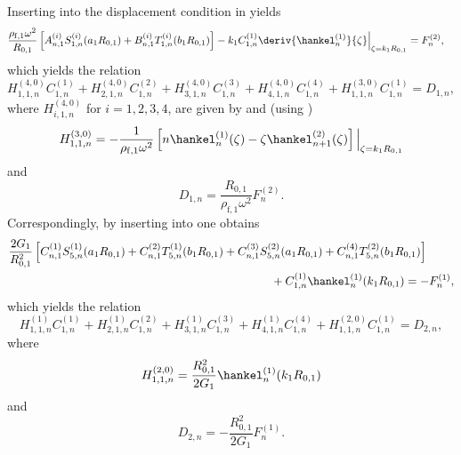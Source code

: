Inserting  into the displacement condition in  yields
\begin{align*}
	&\frac{\rho_{\mathrm{f},1}\omega^2}{R_{0,1}}\left[A_{n,1}^{(i)} S_{1,n}^{(i)}(a_1 R_{0,1}) + B_{n,1}^{(i)} T_{1,n}^{(i)}(b_1 R_{0,1})\right]  -k_1 C_{1,n}^{(1)} \deriv{\hankel^{(1)}_n}{\zeta}\Big\vert_{\zeta=k_1R_{0,1}} = F_n^{(2)},
\end{align*}
which yields the relation
\begin{equation}
	H_{1,1,n}^{(4,0)}C_{1,n}^{(1)} + H_{2,1,n}^{(4,0)}C_{1,n}^{(2)} + H_{3,1,n}^{(4,0)}C_{1,n}^{(3)} + H_{4,1,n}^{(4,0)}C_{1,n}^{(4)} + H_{1,1,n}^{(3,0)}C_{1,n}^{(1)} = D_{1,n},
\end{equation}
where $H_{i,1,n}^{(4,0)}$ for $i=1,2,3,4$, are given by  and (using )
\begin{equation}\label{Eq1:K3011}
	H_{1,1,n}^{(3,0)} = -\frac{1}{\rho_{\mathrm{f},1}\omega^2}\left[n\hankel^{(1)}_n(\zeta) - \zeta \hankel^{(2)}_{n+1}(\zeta)\right]\Big\vert_{\zeta=k_1R_{0,1}}
\end{equation}
and
\begin{equation}\label{Eq1:D1}
	D_{1,n} = \frac{R_{0,1}}{\rho_{\mathrm{f},1}\omega^2}F_n^{(2)}.
\end{equation}
Correspondingly, by inserting  into  one obtains
\begin{align*}
	&\frac{2G_1}{R_{0,1}^2}\left[C_{n,1}^{(1)} S_{5,n}^{(1)}(a_1 R_{0,1}) + C_{n,1}^{(2)} T_{5,n}^{(1)}(b_1 R_{0,1}) + C_{n,1}^{(3)} S_{5,n}^{(2)}(a_1 R_{0,1}) + C_{n,1}^{(4)} T_{5,n}^{(2)}(b_1 R_{0,1})\right] \\
	&{\hskip22.5em\relax} + C_{1,n}^{(1)} \hankel^{(1)}_n(k_1R_{0,1})= -F_n^{(1)},
\end{align*}
which yields the relation
\begin{equation}
	H_{1,1,n}^{(1)}C_{1,n}^{(1)} + H_{2,1,n}^{(1)}C_{1,n}^{(2)} + H_{3,1,n}^{(1)}C_{1,n}^{(3)} + H_{4,1,n}^{(1)}C_{1,n}^{(4)} + H_{1,1,n}^{(2,0)}C_{1,n}^{(1)} = D_{2,n},
\end{equation}
where
\begin{equation}\label{Eq1:K2011}
	H_{1,1,n}^{(2,0)} = \frac{R_{0,1}^2}{2G_1}\hankel^{(1)}_n(k_1R_{0,1})
\end{equation}
and
\begin{equation}\label{Eq1:D2}
	D_{2,n} = -\frac{R_{0,1}^2}{2G_1}F_n^{(1)}.
\end{equation}

